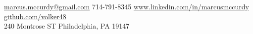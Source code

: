 \documentclass[10pt,a4paper]{article}
\begin{document}
\sloppy  %


\nobreakvspace{0.3em}  %

\noindent\href{mailto:marcus.mccurdy@gmail.com}
{marcus.mccurdy\mbox{}@\mbox{}gmail.com}\sbull
{}714-791-8345\sbull
\href{http://www.linkedin.com/in/marcusmccurdy}
    {www.linkedin.com/in/marcusmccurdy}
\href{http://github.com/volker48}{github.com/volker48}
\\
240 Montrose ST\sbull
Philadelphia, PA 19147\sbull

\spacedhrule{0.9em}{-0.4em}  %

%
%
%
%
\end{document}
